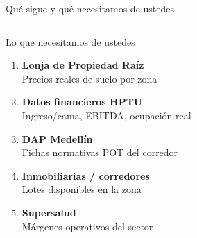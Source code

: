 \documentclass[aspectratio=169, 11pt]{beamer}
\begin{document}
\begin{frame}{Qué sigue y qué necesitamos de ustedes}
\begin{columns}[T]
\begin{alertblock}{\small Lo que necesitamos de ustedes}
\vspace{3pt}
\begin{enumerate}\setlength{\itemsep}{1pt}
  \item[\textcolor{coral}{\textbf{1.}}] \textbf{Lonja de Propiedad Raíz}\\
    {\tiny Precios reales de suelo por zona}
  \item[\textcolor{coral}{\textbf{2.}}] \textbf{Datos financieros HPTU}\\
    {\tiny Ingreso/cama, EBITDA, ocupación real}
  \item[\textcolor{coral}{\textbf{3.}}] \textbf{DAP Medellín}\\
    {\tiny Fichas normativas POT del corredor}
  \item[\textcolor{amber}{\textbf{4.}}] \textbf{Inmobiliarias / corredores}\\
    {\tiny Lotes disponibles en la zona}
  \item[\textcolor{amber}{\textbf{5.}}] \textbf{Supersalud}\\
    {\tiny Márgenes operativos del sector}
\end{enumerate}
\end{alertblock}
\end{columns}
\end{frame}
\end{document}

